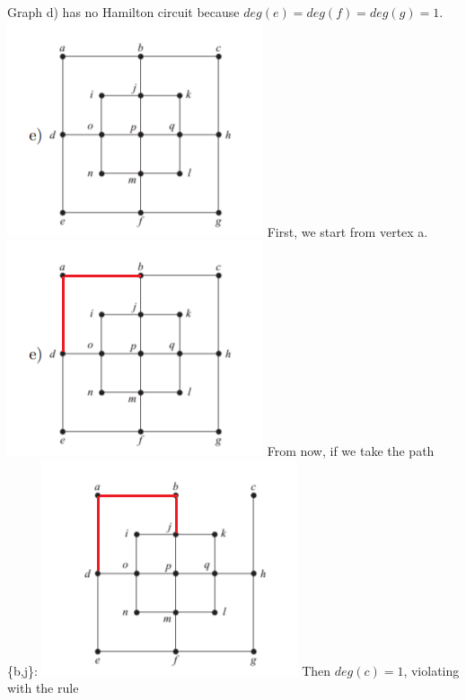 \documentclass{article}
\begin{document}
\newline
Graph d) has no Hamilton circuit because $deg(e) = deg(f) = deg(g) = 1$.
\newline
\includegraphics[]{Question 15/connectivity_15.e.png}
\newline
First, we start from vertex a.
\newline
\includegraphics[]{Question 15/connectivity_15.e.4.png}
\newline
From now, if we take the path \{b,j\}:
\newline
\includegraphics[]{Question 15/connectivity_15.e.3.png}
\newline
Then $deg(c) = 1$, violating with the rule\\
\end{document}
